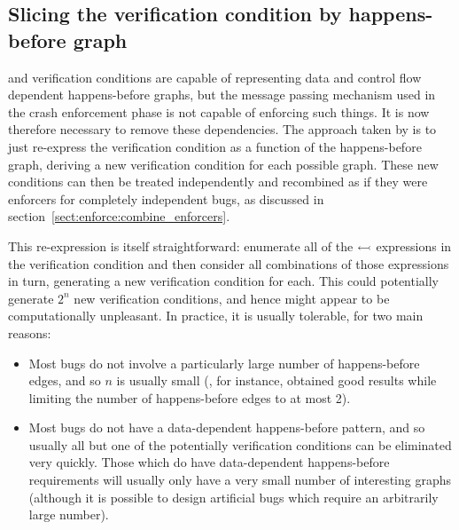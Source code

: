 
\subsection{Slicing the verification condition by happens-before graph}
\label{sect:enforce:slice_hb_graph}


{\STateMachines} and verification conditions are capable of
representing data and control flow dependent happens-before graphs,
but the message passing mechanism used in the crash enforcement phase
is not capable of enforcing such things.  It is now therefore
necessary to remove these dependencies.  The approach taken by
{\implementation} is to just re-express the verification condition as
a function of the happens-before graph, deriving a new verification
condition for each possible graph.  These new conditions can then be
treated independently and recombined as if they were enforcers for
completely independent bugs, as discussed in
section~\ref{sect:enforce:combine_enforcers}.

This re-expression is itself straightforward: enumerate all of the
$\leftarrowtail$ expressions in the verification condition and then
consider all combinations of those expressions in turn, generating a
new verification condition for each.  This could potentially generate
$2^n$ new verification conditions, and hence might appear to be
computationally unpleasant.  In practice, it is usually tolerable, for
two main reasons:

\begin{itemize}
\item
  Most bugs do not involve a particularly large number of
  happens-before edges, and so $n$ is usually small (, for instance, obtained good
  results while limiting the number of happens-before edges to at most
  2).
\item
  Most bugs do not have a data-dependent happens-before pattern, and
  so usually all but one of the potentially verification conditions
  can be eliminated very quickly.  Those which do have data-dependent
  happens-before requirements will usually only have a very small
  number of interesting graphs (although it is possible to design
  artificial bugs which require an arbitrarily large number).
\end{itemize}

